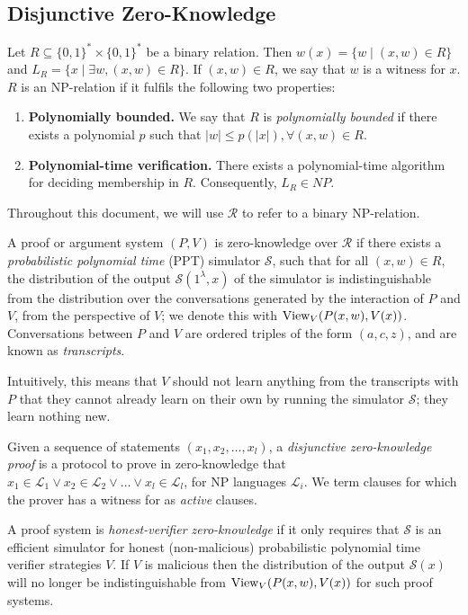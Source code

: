 \subsection{Disjunctive Zero-Knowledge}

\begin{definition}[NP Relations]
Let $R \subseteq \{0,1\}^* \times \{0,1\}^*$ be a binary relation. Then $w(x) = \{w \mid (x,w) \in R\}$ and $L_R = \{x \mid \exists w, (x,w) \in R\}$. If $(x,w) \in R$, we say that $w$ is a witness for $x$. $R$ is an NP-relation if it fulfils the following two properties:
\begin{enumerate}
    \item \textbf{Polynomially bounded.} We say that $R$ is \textit{polynomially bounded} if there exists a polynomial $p$ such that $|w| \le p(|x|), \forall (x,w) \in R$. 
    \item \textbf{Polynomial-time verification.} There exists a polynomial-time algorithm for deciding membership in $R$. Consequently, $L_R \in NP$. 
\end{enumerate}

Throughout this document, we will use $\mathcal R$ to refer to a binary NP-relation.
\end{definition}

\begin{definition}
A proof or argument system $(P,V)$ is zero-knowledge over $\mathcal R$ if there exists a \textit{probabilistic polynomial time} (PPT) simulator $\mathcal S$, such that for all $(x,w) \in R$, the distribution of the output $\mathcal S(1^\lambda, x)$ of the simulator is indistinguishable from the distribution over the conversations generated by the interaction of $P$ and $V$, from the perspective of $V$; we denote this with $\text{View}_V(P(x,w),V(x))$. Conversations between $P$ and $V$ are ordered triples of the form $(a,c,z)$, and are known as \textit{transcripts}.
\end{definition}

Intuitively, this means that $V$ should not learn anything from the transcripts  with $P$ that they cannot already learn on their own by running the simulator $\mathcal S$; they learn nothing new.

\begin{definition}
Given a sequence of statements $(x_1,x_2,\ldots, x_l)$, a \textit{disjunctive zero-knowledge proof} is a protocol to prove in zero-knowledge that $x_1 \in \mathcal L_1 \lor x_2 \in \mathcal L_2 \lor \ldots \lor x_l \in \mathcal L_l$, for NP languages $\mathcal L_i$. We term clauses for which the prover has a witness for as \textit{active} clauses. 
\end{definition}

\begin{definition}
A proof system is \textit{honest-verifier zero-knowledge} if it only requires that $\mathcal S$ is an efficient simulator for honest (non-malicious) probabilistic polynomial time verifier strategies $V$. If $V$ is malicious then the distribution of the output $\mathcal S(x)$ will no longer be indistinguishable from $\text{View}_V(P(x,w),V(x))$ for such proof systems. 
\end{definition}
